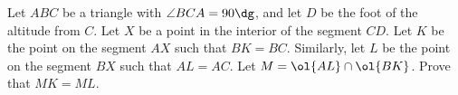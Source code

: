 Let $ABC$ be a triangle with $\angle BCA = 90\dg$,
and let $D$ be the foot of the altitude from $C$.
Let $X$ be a point in the interior of the segment $CD$.
Let $K$ be the point on the segment $AX$ such that $BK = BC$.
Similarly, let $L$ be the point on the segment $BX$ such that $AL = AC$.
Let $M = \ol{AL} \cap \ol{BK}$.
Prove that $MK = ML$.